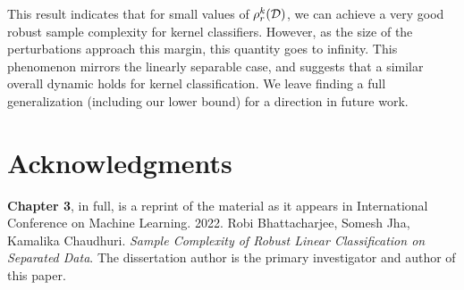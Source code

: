 This result indicates that for small values of $\rho_r^k({\mathcal D})$, we can achieve a very good robust sample complexity for kernel classifiers. However, as the size of the perturbations approach this margin, this quantity goes to infinity. This phenomenon mirrors the linearly separable case, and suggests that a similar overall dynamic holds for kernel classification. We leave finding a full generalization (including our lower bound) for a direction in future work.

\section*{Acknowledgments}

\textbf{Chapter 3}, in full, is a reprint of the material as it appears in International Conference on Machine Learning. 2022. Robi Bhattacharjee,  Somesh Jha, Kamalika Chaudhuri. \emph{Sample Complexity of Robust Linear Classification on Separated Data}. The dissertation author is the primary investigator and author of this paper.






%
%
%
%
%
%
%